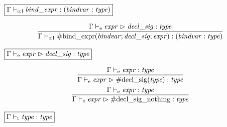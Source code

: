 $\fbox{$\Gamma \vdash_{\mathrm{e}; \mathrm{l}} \mathit{bind\_expr}: (\mathit{bindvar}: \mathit{type})$}$

\begin{gather*}
    \infer{\Gamma \vdash_{\mathrm{e}; \mathrm{l}} \mathrm{\#bind\_expr}(\mathit{bindvar}; \mathit{decl\_sig}; \mathit{expr}): (\mathit{bindvar}: \mathit{type})}{
        \Gamma \vdash_\mathrm{e} \mathit{expr} \vartriangleright \mathit{decl\_sig}: \mathit{type}
    }
\end{gather*}

$\fbox{$\Gamma \vdash_\mathrm{e} \mathit{expr} \vartriangleright \mathit{decl\_sig}: \mathit{type}$}$

\begin{gather*}
    \infer{\Gamma \vdash_\mathrm{e} \mathit{expr} \vartriangleright \mathrm{\#decl\_sig}(\mathit{type}): \mathit{type}}{
        \Gamma \vdash_\mathrm{e} \mathit{expr}: \mathit{type}
    }
    \\
    \infer{\Gamma \vdash_\mathrm{e} \mathit{expr} \vartriangleright \mathrm{\#decl\_sig\_nothing}: \mathit{type}}{
        \Gamma \vdash_\mathrm{e} \mathit{expr}: \mathit{type}
    }
\end{gather*}

$\fbox{$\Gamma \vdash_\mathrm{t} \mathit{type}: \mathit{type}$}$

